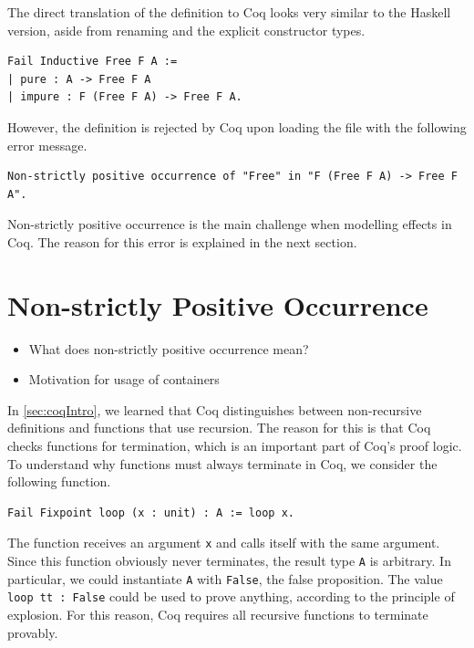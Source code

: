 \documentclass[a4paper, 11pt, fleqn, twoside]{scrreprt}
\begin{document}
The direct translation of the definition to Coq looks very similar to the Haskell version, aside from renaming and the explicit constructor types.

\begin{verbatim}
Fail Inductive Free F A :=
| pure : A -> Free F A
| impure : F (Free F A) -> Free F A.
\end{verbatim}

However, the definition is rejected by Coq upon loading the file with the following error message.

\begin{verbatim}
Non-strictly positive occurrence of "Free" in "F (Free F A) -> Free F A".
\end{verbatim}

Non-strictly positive occurrence is the main challenge when modelling effects in Coq.
The reason for this error is explained in the next section.

\section{Non-strictly Positive Occurrence}
\label{non-strictly}
\begin{itemize}
\item What does non-strictly positive occurrence mean?
\item Motivation for usage of containers
\end{itemize}

In \autoref{sec:coqIntro}, we learned that Coq distinguishes between non-recursive definitions and functions that use recursion.
The reason for this is that Coq checks functions for termination, which is an important part of Coq's proof logic.
To understand why functions must always terminate in Coq, we consider the following function.

\begin{verbatim}
Fail Fixpoint loop (x : unit) : A := loop x.
\end{verbatim}

The function receives an argument \texttt{x} and calls itself with the same argument.
Since this function obviously never terminates, the result type \texttt{A} is arbitrary.
In particular, we could instantiate \texttt{A} with \texttt{False}, the false proposition.
The value \texttt{loop tt : False} could be used to prove anything, according to the principle of explosion.
For this reason, Coq requires all recursive functions to terminate provably.
\end{document}
